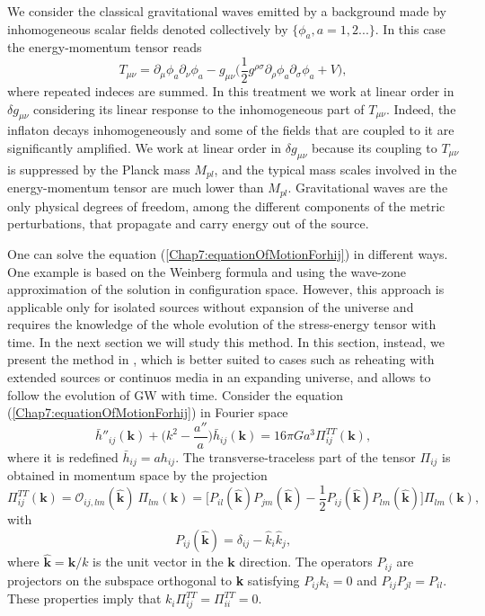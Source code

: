 \documentclass[11pt,a4paper,twoside]{book}
\begin{document}
We consider the classical gravitational waves emitted by a background made by inhomogeneous scalar fields denoted collectively by $ \{\phi_{a},a=1,2...\} $. In this case the energy-momentum tensor reads
\begin{equation}
\label{Chap7:EnergyMomentumTensor}
T_{\mu\nu}=\partial_{\mu}\phi_{a}\partial_{\nu}\phi_{a} - g_{\mu\nu}\Bigg(\frac{1}{2}g^{\rho\sigma}\partial_{\rho}\phi_{a}\partial_\sigma \phi_{a} + V \Bigg),
\end{equation}
where repeated indeces are summed. In this treatment we work at linear order in $ \delta g_{\mu\nu} $ considering its linear response to the inhomogeneous part of $ T_{\mu\nu} $. Indeed, the inflaton decays inhomogeneously and some of the fields that are coupled to it are significantly amplified. We work at linear order in $\delta g_{\mu\nu}$ because its coupling to $ T_{\mu\nu} $ is suppressed by the Planck mass $ M_{pl} $, and the typical mass scales involved in the energy-momentum tensor are much lower than $ M_{pl} $. Gravitational waves are the only physical degrees of freedom, among the different components of the metric perturbations, that propagate and carry energy out of the source.

One can solve the equation (\ref{Chap7:equationOfMotionForhij}) in different ways. One example is based on the Weinberg formula and using the wave-zone approximation of the solution in configuration space. However, this approach is applicable only for isolated sources without expansion of the universe and requires the knowledge of the whole evolution of the stress-energy tensor with time. In the next section we will study this method. In this section, instead, we present the method in \cite{Chap7:GreenMethod}, which is better suited to cases such as reheating with extended sources or continuos media in an expanding universe, and allows to follow the evolution of GW with time.
Consider the equation (\ref{Chap7:equationOfMotionForhij}) in Fourier space
\begin{equation}
	\label{Chap7:EquationGWFourierSpace}
	\bar{h}''_{ij}(\textbf{k}) + \Bigg(k^{2}-\frac{a''}{a}\Bigg)\bar{h}_{ij}(\textbf{k}) = 16\pi Ga^{3}\Pi^{TT}_{ij}(\textbf{k}),
\end{equation}
where it is redefined $ \bar{h}_{ij}=ah_{ij} $. The transverse-traceless part of the tensor $ \Pi_{ij} $ is obtained in momentum space by the projection
\begin{equation}
\label{Chap7:transverseTracelessProjection}
\Pi^{TT}_{ij}(\textbf{k})=\mathcal{O}_{ij,lm}(\hat{\textbf{k}})\ \Pi_{lm}(\textbf{k})= \Biggl[P_{il}(\hat{\textbf{k}})P_{jm}(\hat{\textbf{k}}) - \frac{1}{2}P_{ij}(\hat{\textbf{k}})P_{lm}(\hat{\textbf{k}})\Biggr] \Pi_{lm}(\textbf{k}),
\end{equation}
with
\begin{equation}
\label{Chap7:ProjectionOperator}
P_{ij}(\hat{\textbf{k}})=\delta_{ij}-\hat{k}_{i}\hat{k}_{j},
\end{equation}
where $ \hat{\textbf{k}}=\textbf{k}/k $ is the unit vector in the $ \textbf{k} $ direction. The operators $ P_{ij} $ are projectors on the subspace orthogonal to \textbf{k} satisfying $ P_{ij}k_{i}=0 $ and $ P_{ij}P_{jl}=P_{il} $. These properties imply that $ k_{i}\Pi^{TT}_{ij} = \Pi^{TT}_{ii}=0. $
\end{document}
